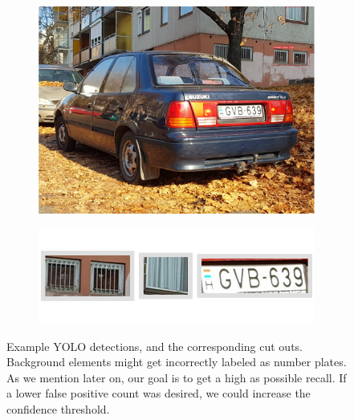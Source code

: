 \begin{figure}
\begin{subfigure}[b]{.15\textwidth}
    \end{subfigure}
    \hfill\hfill
    \\
    \begin{subfigure}[b]{.55\textwidth}
        \includegraphics[width=\textwidth]{figures/yolo/179.jpg}
    \end{subfigure}
    \hfill
    \begin{subfigure}[b]{.4\textwidth}
        \includegraphics[width=\textwidth]{figures/yolo/179_montage.png}
    \end{subfigure}
    \hfill
    \caption{Example YOLO detections, and the corresponding cut outs.
        Background elements might get incorrectly labeled as number plates.  As
        we mention later on, our goal is to get a high as possible recall. If
        a lower false positive count was desired, we could increase the
    confidence threshold.}
    \label{fig:yolo-detection-montages}
\end{figure}

